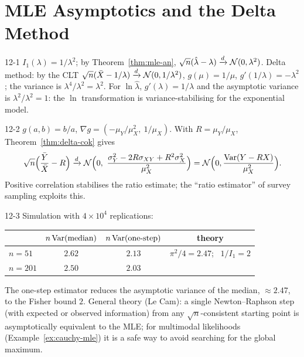 \section{MLE Asymptotics and the Delta Method}

\begin{solution}{12-1}
$I_1(\lambda)=1/\lambda^2$; by Theorem~\ref{thm:mle-an}, $\sqrt n(\hat\lambda-\lambda)\xrightarrow{d}\mathcal{N}(0,\lambda^2)$. Delta method: by the CLT $\sqrt n(\bar X-1/\lambda)\xrightarrow{d}\mathcal{N}(0,1/\lambda^2)$, $g(\mu)=1/\mu$, $g'(1/\lambda)=-\lambda^2$; the variance is $\lambda^4/\lambda^2=\lambda^2$. For $\ln\hat\lambda$, $g'(\lambda)=1/\lambda$ and the asymptotic variance is $\lambda^2/\lambda^2=1$: the $\ln$ transformation is variance-stabilising for the exponential model.
\end{solution}

\begin{solution}{12-2}
$g(a,b)=b/a$, $\nabla g=(-\mu_Y/\mu_X^2,\ 1/\mu_X)$. With $R=\mu_Y/\mu_X$, Theorem~\ref{thm:delta-cok} gives
\[
\sqrt n\Big(\frac{\bar Y}{\bar X}-R\Big)\dto\Normal\Big(0,\ \frac{\sigma_Y^2-2R\sigma_{XY}+R^2\sigma_X^2}{\mu_X^2}\Big)=\Normal\Big(0,\frac{\Var(Y-RX)}{\mu_X^2}\Big).
\]
Positive correlation stabilises the ratio estimate; the ``ratio estimator'' of survey sampling exploits this.
\end{solution}

\begin{solution}{12-3}
Simulation with $4\times10^4$ replications:
\begin{center}\small
\begin{tabular}{@{}lccc@{}}\toprule
 & $n\operatorname{Var}(\text{median})$ & $n\operatorname{Var}(\text{one-step})$ & theory\\\midrule
$n=51$ & $2.62$ & $2.13$ & $\pi^2/4=2.47$; \ $1/I_1=2$\\
$n=201$ & $2.50$ & $2.03$ & \\\bottomrule
\end{tabular}
\end{center}
The one-step estimator reduces the asymptotic variance of the median, $\approx2.47$, to the Fisher bound $2$. General theory (Le Cam): a single Newton--Raphson step (with expected or observed information) from any $\sqrt n$-consistent starting point is asymptotically equivalent to the MLE; for multimodal likelihoods (Example~\ref{ex:cauchy-mle}) it is a safe way to avoid searching for the global maximum.
\end{solution}

